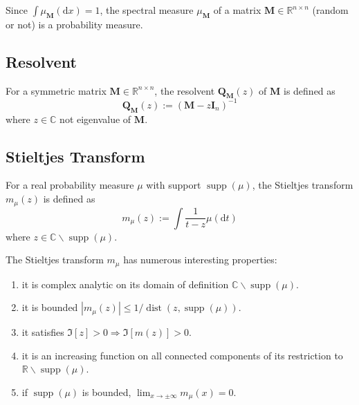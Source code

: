 \begin{remark}
    Since $\int\mu_{\mathbf{M}}\left(\mathrm{d}x\right)=1$, the spectral measure $\mu_{\mathbf{M}}$ of a matrix $\mathbf{M}\in\mathbb{R}^{n\times n}$ (random or not) is a probability measure.
\end{remark}

\subsection*{Resolvent}

\begin{definition}[Resolvent]
    For a symmetric matrix $\mathbf{M}\in\mathbb{R}^{n\times n}$, the resolvent $\mathbf{Q}_{\mathbf{M}}(z)$ of $\mathbf{M}$ is defined as
    \begin{equation}
        \mathbf{Q}_{\mathbf{M}}(z):=\left(\mathbf{M}-z\mathbf{I}_{n}\right)^{-1}
    \end{equation}
    where $z\in\mathbb{C}$ not eigenvalue of $\mathbf{M}$.
\end{definition}

\subsection*{Stieltjes Transform}

\begin{definition}
    For a real probability measure $\mu$ with support $\operatorname{supp}(\mu)$, the Stieltjes transform $m_{\mu}(z)$ is defined as
    \begin{equation}
        m_{\mu}(z):=\int\frac{1}{t-z}\mu\left(\mathrm{d}t\right)
    \end{equation}
    where $z\in\mathbb{C}\backslash\operatorname{supp}(\mu)$.
\end{definition}

\begin{property}
    The Stieltjes transform $m_{\mu}$ has numerous interesting properties:
    \begin{enumerate}
        \item it is complex analytic on its domain of definition $\mathbb{C} \backslash \operatorname{supp}(\mu)$.
        \item it is bounded $\left|m_{\mu}(z)\right|\leq 1/\operatorname{dist}(z,\operatorname{supp}(\mu))$.
        \item it satisfies $\Im[z]>0 \Rightarrow \Im[m(z)]>0$.
        \item it is an increasing function on all connected components of its restriction to $\mathbb{R}\backslash\operatorname{supp}(\mu)$. %
        \item if $\operatorname{supp}(\mu)$ is bounded, $\lim_{x\rightarrow\pm\infty}m_{\mu}(x)=0$.
    \end{enumerate}
\end{property}


